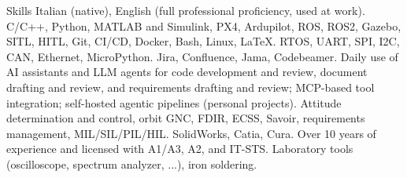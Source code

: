 \begin{rubric}{Skills}
\entry*[Languages]
    Italian (native), English (full professional proficiency, used at work).
\entry*[Coding]
    C/C++, Python, MATLAB and Simulink, PX4, Ardupilot, ROS, ROS2, Gazebo, SITL, HITL, Git, CI/CD, Docker, Bash, Linux, \LaTeX.
\entry*[Embedded]
    RTOS, UART, SPI, I2C, CAN, Ethernet, MicroPython.
\entry*[Tools]
    Jira, Confluence, Jama, Codebeamer.
\entry*[AI \& Automation]
    Daily use of AI assistants and LLM agents for code development and review, document drafting and review, and requirements drafting and review; MCP-based tool integration; self-hosted agentic pipelines (personal projects).
    Attitude determination and control, orbit GNC, FDIR, ECSS, Savoir, requirements management, MIL/SIL/PIL/HIL.
    SolidWorks, Catia, Cura.
    Over 10 years of experience and licensed with A1/A3, A2, and IT-STS.
 \entry*[Laboratory]
     Laboratory tools (oscilloscope, spectrum analyzer, ...), iron soldering.
\end{rubric}

